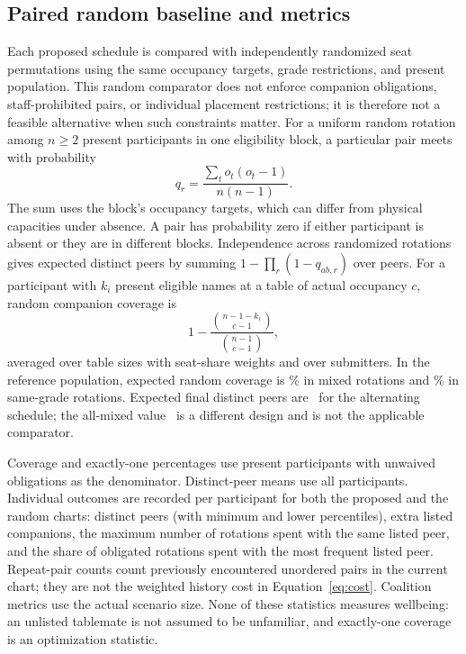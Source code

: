 \documentclass[11pt,a4paper]{article}
\theoremstyle{definition}\newtheorem{definition}[theorem]{Definition}
\theoremstyle{remark}\newtheorem{remark}[theorem]{Remark}
\begin{document}
\subsection{Paired random baseline and metrics}
Each proposed schedule is compared with independently randomized seat permutations using the same occupancy targets, grade restrictions, and present population. This random comparator does not enforce companion obligations, staff-prohibited pairs, or individual placement restrictions; it is therefore not a feasible alternative when such constraints matter. For a uniform random rotation among $n\ge2$ present participants in one eligibility block, a particular pair meets with probability
\begin{equation}
 q_r=\frac{\sum_t o_t(o_t-1)}{n(n-1)}.
\end{equation}
The sum uses the block's occupancy targets, which can differ from physical capacities under absence. A pair has probability zero if either participant is absent or they are in different blocks. Independence across randomized rotations gives expected distinct peers by summing $1-\prod_r(1-q_{ab,r})$ over peers. For a participant with $k_i$ present eligible names at a table of actual occupancy $c$, random companion coverage is
\begin{equation}
 1-\frac{\binom{n-1-k_i}{c-1}}{\binom{n-1}{c-1}},
\end{equation}
averaged over table sizes with seat-share weights and over submitters. In the reference population, expected random coverage is \RandomGeOneExpectedMixed\% in mixed rotations and \RandomGeOneExpectedSame\% in same-grade rotations. Expected final distinct peers are \RandomMetExpected\ for the alternating schedule; the all-mixed value \RandomMetExpectedAllMixed\ is a different design and is not the applicable comparator.

Coverage and exactly-one percentages use present participants with unwaived obligations as the denominator. Distinct-peer means use all participants. Individual outcomes are recorded per participant for both the proposed and the random charts: distinct peers (with minimum and lower percentiles), extra listed companions, the maximum number of rotations spent with the same listed peer, and the share of obligated rotations spent with the most frequent listed peer. Repeat-pair counts count previously encountered unordered pairs in the current chart; they are not the weighted history cost in Equation~\eqref{eq:cost}. Coalition metrics use the actual scenario size. None of these statistics measures wellbeing: an unlisted tablemate is not assumed to be unfamiliar, and exactly-one coverage is an optimization statistic.
\end{document}
